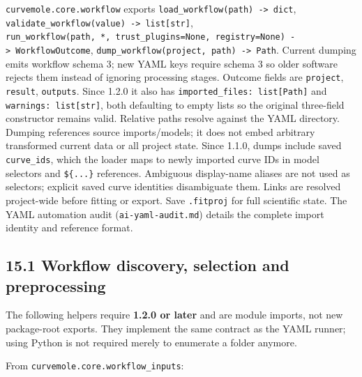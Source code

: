 \documentclass[
  10pt,
  a4paper,
  oneside]{scrreprt}
\begin{document}
\texttt{curvemole.core.workflow} exports
\texttt{load\_workflow(path)\ -\textgreater{}\ dict},
\texttt{validate\_workflow(value)\ -\textgreater{}\ list{[}str{]}},
\texttt{run\_workflow(path,\ *,\ trust\_plugins=None,\ registry=None)\ -\textgreater{}\ WorkflowOutcome},
\texttt{dump\_workflow(project,\ path)\ -\textgreater{}\ Path}. Current
dumping emits workflow schema 3; new YAML keys require schema 3 so older
software rejects them instead of ignoring processing stages. Outcome
fields are \texttt{project}, \texttt{result}, \texttt{outputs}. Since
1.2.0 it also has \texttt{imported\_files:\ list{[}Path{]}} and
\texttt{warnings:\ list{[}str{]}}, both defaulting to empty lists so the
original three-field constructor remains valid. Relative paths resolve
against the YAML directory. Dumping references source imports/models; it
does not embed arbitrary transformed current data or all project state.
Since 1.1.0, dumps include saved \texttt{curve\_ids}, which the loader
maps to newly imported curve IDs in model selectors and
\texttt{\$\{...\}} references. Ambiguous display-name aliases are not
used as selectors; explicit saved curve identities disambiguate them.
Links are resolved project-wide before fitting or export. Save
\texttt{.fitproj} for full scientific state. The YAML automation audit
(\texttt{ai-yaml-audit.md}) details the complete import identity and
reference format.

\hypertarget{workflow-discovery-selection-and-preprocessing}{%
\subsection{15.1 Workflow discovery, selection and
preprocessing}\label{workflow-discovery-selection-and-preprocessing}}

The following helpers require \textbf{1.2.0 or later} and are module
imports, not new package-root exports. They implement the same contract
as the YAML runner; using Python is not required merely to enumerate a
folder anymore.

From \texttt{curvemole.core.workflow\_inputs}:
\end{document}
